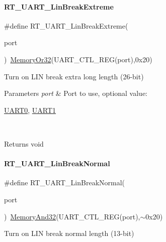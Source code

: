 \paragraph{\texorpdfstring{R\+T\+\_\+\+U\+A\+R\+T\+\_\+\+Lin\+Break\+Extreme}{RT\_UART\_LinBreakExtreme}}
{\footnotesize\ttfamily \#define R\+T\+\_\+\+U\+A\+R\+T\+\_\+\+Lin\+Break\+Extreme(\begin{DoxyParamCaption}\item[{}]{port }\end{DoxyParamCaption})~\mbox{\hyperlink{a00068_a27874a97deab7cecdde5ddecf466e31e}{Memory\+Or32}}(U\+A\+R\+T\+\_\+\+C\+T\+L\+\_\+\+R\+EG(port),0x20)}



Turn on L\+IN break extra long length (26-\/bit) 


\begin{DoxyParams}{Parameters}
{\em port} & Port to use, optional value\+:
\begin{DoxyCode}
\mbox{\hyperlink{a00173_a0508661f121639ffdee7de2353a0def2}{UART0}}, \mbox{\hyperlink{a00173_a8d69bf04d07af4fbbab5a8bd291f65ff}{UART1}}
\end{DoxyCode}
 \\
\hline
\end{DoxyParams}
\begin{DoxyReturn}{Returns}
void 
\end{DoxyReturn}
\mbox{\label{a00173_a45d1e1116c5b535f276acc73e522570f}} 
\paragraph{\texorpdfstring{R\+T\+\_\+\+U\+A\+R\+T\+\_\+\+Lin\+Break\+Normal}{RT\_UART\_LinBreakNormal}}
{\footnotesize\ttfamily \#define R\+T\+\_\+\+U\+A\+R\+T\+\_\+\+Lin\+Break\+Normal(\begin{DoxyParamCaption}\item[{}]{port }\end{DoxyParamCaption})~\mbox{\hyperlink{a00068_ad87cedffcaadc51db22594fce55173d4}{Memory\+And32}}(U\+A\+R\+T\+\_\+\+C\+T\+L\+\_\+\+R\+EG(port),$\sim$0x20)}



Turn on L\+IN break normal length (13-\/bit) 


